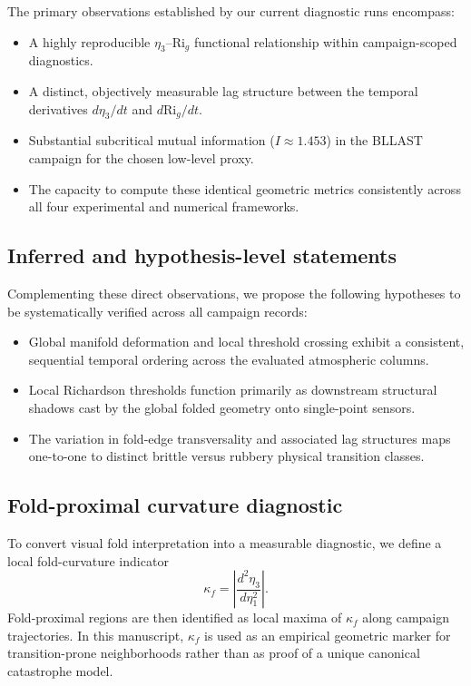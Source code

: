 \documentclass[12pt,a4paper]{article}
\newcommand{\Rig}{\mathrm{Ri}_g}
\begin{document}
The primary observations established by our current diagnostic runs encompass:
\begin{itemize}
  \item A highly reproducible $\eta_3$--$\Rig$ functional relationship within campaign-scoped diagnostics.
  \item A distinct, objectively measurable lag structure between the temporal derivatives $d\eta_3/dt$ and $d\Rig/dt$.
  \item Substantial subcritical mutual information ($I \approx 1.453$) in the BLLAST campaign for the chosen low-level proxy.
  \item The capacity to compute these identical geometric metrics consistently across all four experimental and numerical frameworks.
\end{itemize}

\subsection{Inferred and hypothesis-level statements}

Complementing these direct observations, we propose the following hypotheses to be systematically verified across all campaign records:
\begin{itemize}
  \item Global manifold deformation and local threshold crossing exhibit a consistent, sequential temporal ordering across the evaluated atmospheric columns.
  \item Local Richardson thresholds function primarily as downstream structural shadows cast by the global folded geometry onto single-point sensors.
  \item The variation in fold-edge transversality and associated lag structures maps one-to-one to distinct brittle versus rubbery physical transition classes.
\end{itemize}

\subsection{Fold-proximal curvature diagnostic}

To convert visual fold interpretation into a measurable diagnostic, we define a local fold-curvature indicator
\begin{equation}
\kappa_f = \left|\frac{d^2\eta_3}{d\eta_1^2}\right|.
\end{equation}
Fold-proximal regions are then identified as local maxima of $\kappa_f$ along campaign trajectories. In this manuscript, $\kappa_f$ is used as an empirical geometric marker for transition-prone neighborhoods rather than as proof of a unique canonical catastrophe model.
\end{document}
